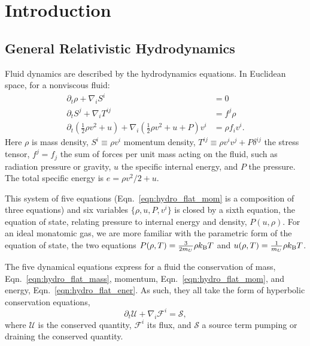 \chapter{Introduction}
\label{chap:intro}



\section{General Relativistic Hydrodynamics}
\label{sec:gr_hydro}
Fluid dynamics are described by the hydrodynamics equations. In
Euclidean space, for a nonviscous fluid:
\begin{align}
  \label{eqn:hydro_flat_mass}
  \partial_t \rho + \nabla_i S^i       &= 0 \\
  \label{eqn:hydro_flat_mom}
  \partial_t S^j +  \nabla_i T^{ij}    &= f^j \rho \\
  \label{eqn:hydro_flat_ener}
  \partial_t (\frac{1}{2}\rho v^2+u) + \nabla_i(\frac{1}{2}\rho v^2+u+P)v^i &= \rho f_i v^i.
\end{align}
Here $\rho$ is mass density,
$S^i\equiv \rho v^i$ momentum density,
$T^{ij}\equiv \rho v^i v^j + P\delta^{ij}$ the stress tensor,
$f^j=f_j$ the sum of forces per unit mass acting on the fluid,
such as radiation pressure or gravity,
$u$ the specific internal energy, and
$P$ the pressure.
The total specific energy is $e=\rho v^2/2+u$.

This system of five equations (Eqn.~\ref{eqn:hydro_flat_mom} is a composition
of three equations) and six variables $\{\rho,u,P,v^i\}$ is closed by a sixth
equation, the equation of state, relating pressure to internal energy and
density, $P(u,\rho)$.
For an ideal monatomic gas,
we are more familiar with the parametric form of the equation
of state, the two equations $P(\rho,T)=\frac{3}{2m_U}\rho k_{\rm B} T$ and
$u(\rho,T)=\frac{1}{m_U}\rho k_{\rm B} T$.

The five dynamical equations
express for a fluid the conservation of
mass, Eqn.~\ref{eqn:hydro_flat_mass},
momentum, Eqn.~\ref{eqn:hydro_flat_mom}, and
energy, Eqn.~\ref{eqn:hydro_flat_ener}.
As such, they all take the form of hyperbolic conservation equations,
\begin{equation}
  \label{eqn:cons_hyper}
  \partial_t \mathcal{U} + \nabla_i \mathcal{F}^i = \mathcal{S},
\end{equation}
where $\mathcal{U}$ is the conserved quantity,
$\mathcal{F}^i$ its flux, and
$\mathcal{S}$ a source term pumping or draining the conserved quantity.

